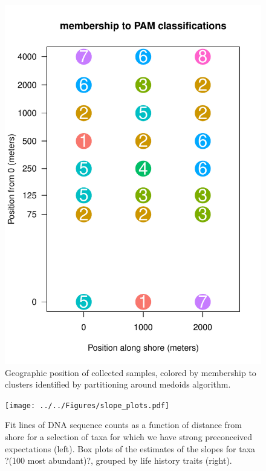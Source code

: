 \documentclass[11pt,letterpaper]{article} %
\begin{document}
\begin{figure}[h!] %
  \centering
    \includegraphics[width=1\textwidth]{../../Figures/pam_in_space.pdf}
    \caption{Geographic position of collected samples, colored by membership to clusters identified by partitioning around medoids algorithm. 
}
  \label{clustering_map} %
\end{figure}

\begin{figure}[h!] %
  \centering
    \texttt{[image: ../../Figures/slope\_plots.pdf]}
    \caption{Fit lines of DNA sequence counts as a function of distance from shore for a selection of taxa for which we have strong preconceived expectations (left). Box plots of the estimates of the slopes for taxa ?(100 most abundant)?, grouped by life history traits (right).}
  \label{slope_plots} %
\end{figure}
\end{document}
